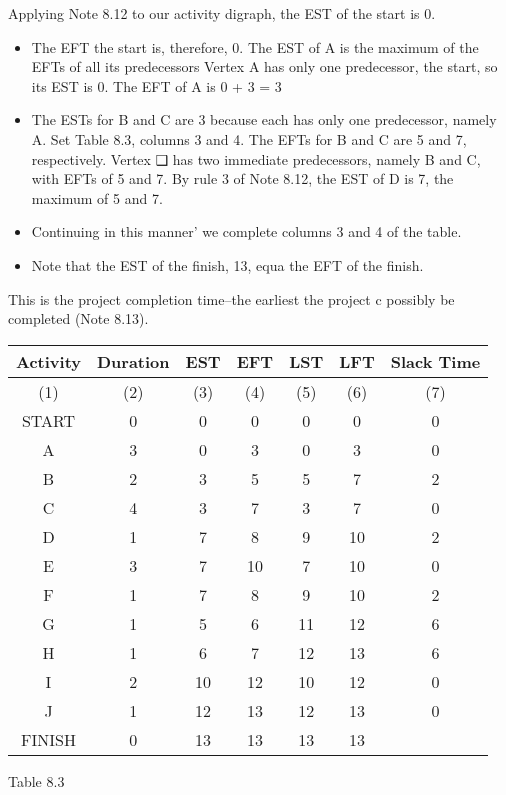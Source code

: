 \documentclass{article}
\begin{document}
Applying Note 8.12 to our activity digraph, the EST of the start is 0. 

\begin{itemize}
\item The EFT 
the start is, therefore, 0. The EST of A is the maximum of the EFTs of all its predecessors 
Vertex A has only one predecessor, the start, so its EST is 0. The EFT of A is 0 + 3 = 3 
\item The ESTs for B and C are 3 because each has only one predecessor, namely A. Set 
Table 8.3, columns 3 and 4. The EFTs for B and C are 5 and 7, respectively. Vertex ❑ 
has two immediate predecessors, namely B and C, with EFTs of 5 and 7. By rule 3 of 
Note 8.12, the EST of D is 7, the maximum of 5 and 7. \item Continuing in this manner' 
we complete columns 3 and 4 of the table.\item  Note that the EST of the finish, 13, equa 
the EFT of the finish. 
\end{itemize} This is the project completion time--the earliest the project c 
possibly be completed (Note 8.13). 
\begin{center}
\begin{tabular}{|c|c|c|c|c|c|c|}
Activity & Duration & EST & EFT & LST & LFT 
& Slack Time  \\ \hline 
(1) & (2)  & (3) & (4) & (5) & (6) & (7) \\ \hline

START & 0 & 0 & 0 & 0 & 0 & 0 \\ \hline

A & 3 & 0 & 3 & 0 & 3 & 0 \\ \hline 

B & 2 & 3 & 5 & 5 & 7 & 2 \\ \hline

C & 4 & 3 & 7 & 3 & 7 & 0 \\ \hline 

D & 1 & 7 & 8 & 9 & 10 & 2 \\ \hline 

E & 3 & 7 & 10 & 7 & 10 & 0 \\ \hline 

F & 1 & 7 & 8 & 9 & 10 & 2 \\ \hline 

G & 1 & 5 & 6 & 11 & 12 & 6 \\ \hline 

H & 1 & 6 & 7 & 12 & 13 & 6 \\ \hline 

I & 2 & 10 & 12 & 10 & 12 & 0 \\ \hline 

J & 1 & 12 & 13 & 12 & 13 & 0 \\ \hline 

FINISH & 0 & 13 & 13 & 13 & 13  & \\ \hline 
\end{tabular}
\end{center}
Table 8.3 
\end{document}
